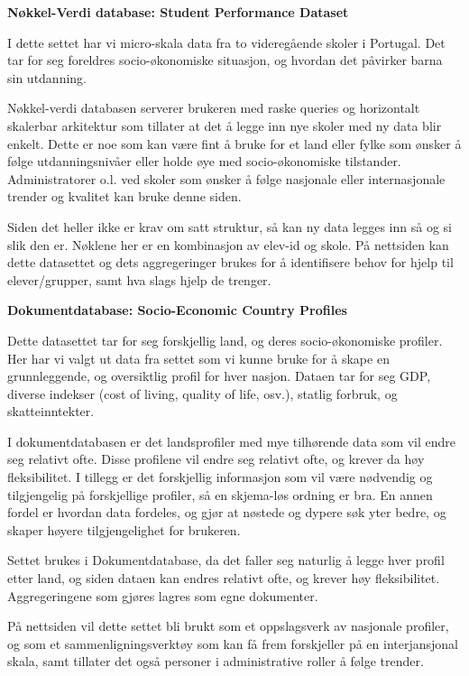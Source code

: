 

\textbf{Nøkkel-Verdi database: Student Performance Dataset}

I dette settet har vi micro-skala data fra to videregående skoler i Portugal. Det tar for seg foreldres socio-økonomiske situasjon, og hvordan det påvirker barna sin utdanning.

Nøkkel-verdi databasen serverer brukeren med raske queries og horizontalt skalerbar arkitektur som tillater at det å legge inn nye skoler med ny data blir enkelt. Dette er noe som kan være fint å bruke for et land eller fylke som ønsker å følge utdanningsnivåer eller holde øye med socio-økonomiske tilstander. Administratorer o.l. ved skoler som ønsker å følge nasjonale eller internasjonale trender og kvalitet kan bruke denne siden.

Siden det heller ikke er krav om satt struktur, så kan ny data legges inn så og si slik den er. Nøklene her er en kombinasjon av elev-id og skole. På nettsiden kan dette datasettet og dets aggregeringer brukes for å identifisere behov for hjelp til elever/grupper, samt hva slags hjelp de trenger.



\textbf{Dokumentdatabase: Socio-Economic Country Profiles}

Dette datasettet tar for seg forskjellig land, og deres socio-økonomiske profiler. Her har vi valgt ut data fra settet som vi kunne bruke for å skape en grunnleggende, og oversiktlig profil for hver nasjon. Dataen tar for seg GDP, diverse indekser (cost of living, quality of life, osv.), statlig forbruk, og skatteinntekter.

I dokumentdatabasen er det landsprofiler med mye tilhørende data som vil endre seg relativt ofte. Disse profilene vil endre seg relativt ofte, og krever da høy fleksibilitet. I tillegg er det forskjellig informasjon som vil være nødvendig og tilgjengelig på forskjellige profiler, så en skjema-løs ordning er bra. En annen fordel er hvordan data fordeles, og gjør at nøstede og dypere søk yter bedre, og skaper høyere tilgjengelighet for brukeren.

Settet brukes i Dokumentdatabase, da det faller seg naturlig å legge hver profil etter land, og siden dataen kan endres relativt ofte, og krever høy fleksibilitet. Aggregeringene som gjøres lagres som egne dokumenter.

På nettsiden vil dette settet bli brukt som et oppslagsverk av nasjonale profiler, og som et sammenligningsverktøy som kan få frem forskjeller på en interjansjonal skala, samt tillater det også personer i administrative roller å følge trender.


